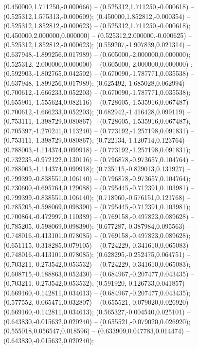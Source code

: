  (0.450000,1.711250,-0.000666) -- (0.525312,1.711250,-0.000618) -- (0.525312,1.575313,-0.000609);
 (0.450000,1.852812,-0.000354) -- (0.525312,1.852812,-0.000623) -- (0.525312,1.711250,-0.000618);
 (0.450000,2.000000,0.000000) -- (0.525312,2.000000,-0.000625) -- (0.525312,1.852812,-0.000623);
 (0.559207,-1.907839,0.021314) -- (0.637948,-1.899256,0.017989) -- (0.605000,-2.000000,0.000000);
 (0.525312,-2.000000,0.000000) -- (0.605000,-2.000000,0.000000) ;
 (0.592903,-1.802765,0.042502) -- (0.670090,-1.787771,0.035538) -- (0.637948,-1.899256,0.017989);
 (0.625492,-1.685028,0.062994) -- (0.700612,-1.666233,0.052203) -- (0.670090,-1.787771,0.035538);
 (0.655901,-1.555624,0.082116) -- (0.728605,-1.535916,0.067487) -- (0.700612,-1.666233,0.052203);
 (0.682942,-1.416428,0.099119) -- (0.753111,-1.398729,0.080867) -- (0.728605,-1.535916,0.067487);
 (0.705397,-1.270241,0.113240) -- (0.773192,-1.257198,0.091831) -- (0.753111,-1.398729,0.080867);
 (0.722134,-1.120714,0.123764) -- (0.788003,-1.114374,0.099918) -- (0.773192,-1.257198,0.091831);
 (0.732235,-0.972122,0.130116) -- (0.796878,-0.973657,0.104764) -- (0.788003,-1.114374,0.099918);
 (0.735115,-0.829013,0.131927) -- (0.799399,-0.838551,0.106140) -- (0.796878,-0.973657,0.104764);
 (0.730600,-0.695764,0.129088) -- (0.795445,-0.712391,0.103981) -- (0.799399,-0.838551,0.106140);
 (0.718960,-0.576151,0.121768) -- (0.785205,-0.598069,0.098390) -- (0.795445,-0.712391,0.103981);
 (0.700864,-0.472997,0.110389) -- (0.769158,-0.497823,0.089628) -- (0.785205,-0.598069,0.098390);
 (0.677287,-0.387984,0.095563) -- (0.748016,-0.413101,0.078085) -- (0.769158,-0.497823,0.089628);
 (0.651115,-0.318285,0.079105) -- (0.724229,-0.341610,0.065083) -- (0.748016,-0.413101,0.078085);
 (0.628295,-0.252475,0.064751) -- (0.703211,-0.273542,0.053532) -- (0.724229,-0.341610,0.065083);
 (0.608715,-0.188863,0.052430) -- (0.684967,-0.207477,0.043435) -- (0.703211,-0.273542,0.053532);
 (0.591920,-0.126733,0.041857) -- (0.669160,-0.142811,0.034613) -- (0.684967,-0.207477,0.043435);
 (0.577552,-0.065471,0.032807) -- (0.655521,-0.079020,0.026920) -- (0.669160,-0.142811,0.034613);
 (0.565327,-0.004540,0.025101) -- (0.643830,-0.015632,0.020240) -- (0.655521,-0.079020,0.026920);
 (0.555018,0.056547,0.018596) -- (0.633909,0.047783,0.014474) -- (0.643830,-0.015632,0.020240);
